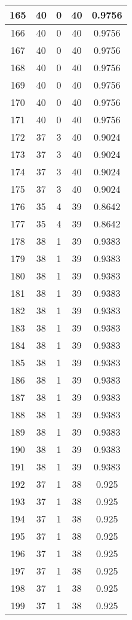 \documentclass[letterpaper, 12pt]{article}
\begin{document}
\begin{longtable}{|c|c|c|c|c|}
\hline
165 & 40 & 0 & 40 & 0.9756 \\
\hline
166 & 40 & 0 & 40 & 0.9756 \\
\hline
167 & 40 & 0 & 40 & 0.9756 \\
\hline
168 & 40 & 0 & 40 & 0.9756 \\
\hline
169 & 40 & 0 & 40 & 0.9756 \\
\hline
170 & 40 & 0 & 40 & 0.9756 \\
\hline
171 & 40 & 0 & 40 & 0.9756 \\
\hline
172 & 37 & 3 & 40 & 0.9024 \\
\hline
173 & 37 & 3 & 40 & 0.9024 \\
\hline
174 & 37 & 3 & 40 & 0.9024 \\
\hline
175 & 37 & 3 & 40 & 0.9024 \\
\hline
176 & 35 & 4 & 39 & 0.8642 \\
\hline
177 & 35 & 4 & 39 & 0.8642 \\
\hline
178 & 38 & 1 & 39 & 0.9383 \\
\hline
179 & 38 & 1 & 39 & 0.9383 \\
\hline
180 & 38 & 1 & 39 & 0.9383 \\
\hline
181 & 38 & 1 & 39 & 0.9383 \\
\hline
182 & 38 & 1 & 39 & 0.9383 \\
\hline
183 & 38 & 1 & 39 & 0.9383 \\
\hline
184 & 38 & 1 & 39 & 0.9383 \\
\hline
185 & 38 & 1 & 39 & 0.9383 \\
\hline
186 & 38 & 1 & 39 & 0.9383 \\
\hline
187 & 38 & 1 & 39 & 0.9383 \\
\hline
188 & 38 & 1 & 39 & 0.9383 \\
\hline
189 & 38 & 1 & 39 & 0.9383 \\
\hline
190 & 38 & 1 & 39 & 0.9383 \\
\hline
191 & 38 & 1 & 39 & 0.9383 \\
\hline
192 & 37 & 1 & 38 & 0.925 \\
\hline
193 & 37 & 1 & 38 & 0.925 \\
\hline
194 & 37 & 1 & 38 & 0.925 \\
\hline
195 & 37 & 1 & 38 & 0.925 \\
\hline
196 & 37 & 1 & 38 & 0.925 \\
\hline
197 & 37 & 1 & 38 & 0.925 \\
\hline
198 & 37 & 1 & 38 & 0.925 \\
\hline
199 & 37 & 1 & 38 & 0.925 \\
\hline
\end{longtable}
\end{document}
